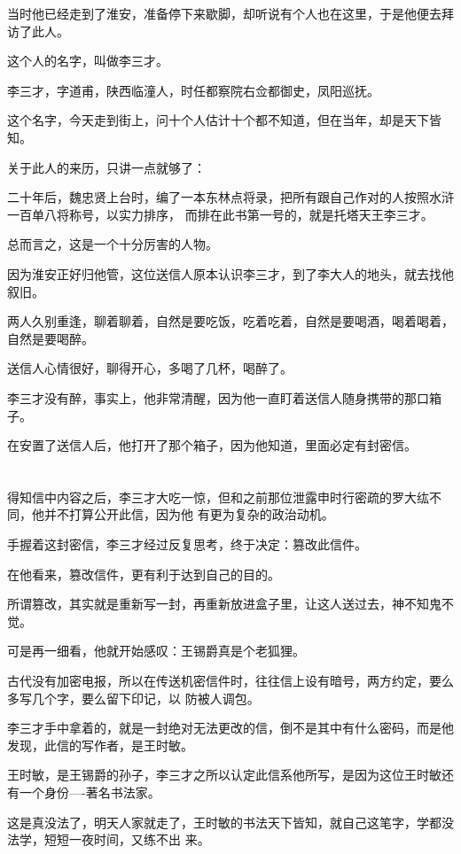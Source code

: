 \documentclass[11pt,a4paper,onecolumn]{article}
\begin{document}
当时他已经走到了淮安，准备停下来歇脚，却听说有个人也在这里，于是他便去拜访了此人。

这个人的名字，叫做李三才。

李三才，字道甫，陕西临潼人，时任都察院右佥都御史，凤阳巡抚。

这个名字，今天走到街上，问十个人估计十个都不知道，但在当年，却是天下皆知。

关于此人的来历，只讲一点就够了：

二十年后，魏忠贤上台时，编了一本东林点将录，把所有跟自己作对的人按照水浒一百单八将称号，以实力排序，
而排在此书第一号的，就是托塔天王李三才。

总而言之，这是一个十分厉害的人物。

因为淮安正好归他管，这位送信人原本认识李三才，到了李大人的地头，就去找他叙旧。

两人久别重逢，聊着聊着，自然是要吃饭，吃着吃着，自然是要喝酒，喝着喝着，自然是要喝醉。

送信人心情很好，聊得开心，多喝了几杯，喝醉了。

李三才没有醉，事实上，他非常清醒，因为他一直盯着送信人随身携带的那口箱子。

在安置了送信人后，他打开了那个箱子，因为他知道，里面必定有封密信。

\section[\thesection]{}

得知信中内容之后，李三才大吃一惊，但和之前那位泄露申时行密疏的罗大纮不同，他并不打算公开此信，因为他
有更为复杂的政治动机。

手握着这封密信，李三才经过反复思考，终于决定：篡改此信件。

在他看来，篡改信件，更有利于达到自己的目的。

所谓篡改，其实就是重新写一封，再重新放进盒子里，让这人送过去，神不知鬼不觉。

可是再一细看，他就开始感叹：王锡爵真是个老狐狸。

古代没有加密电报，所以在传送机密信件时，往往信上设有暗号，两方约定，要么多写几个字，要么留下印记，以
防被人调包。

李三才手中拿着的，就是一封绝对无法更改的信，倒不是其中有什么密码，而是他发现，此信的写作者，是王时敏。

王时敏，是王锡爵的孙子，李三才之所以认定此信系他所写，是因为这位王时敏还有一个身份----著名书法家。

这是真没法了，明天人家就走了，王时敏的书法天下皆知，就自己这笔字，学都没法学，短短一夜时间，又练不出
来。
\end{document}
